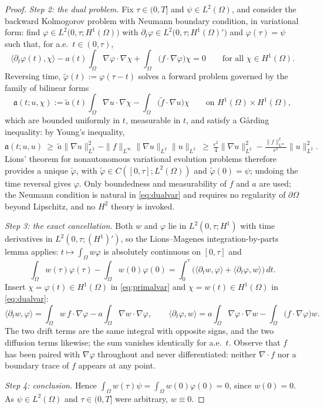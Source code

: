 \documentclass[11pt]{amsart}
\theoremstyle{definition}
\newcommand{\dive}{\nabla\!\cdot}
\newcommand{\dd}{\,d}
\begin{document}
\begin{proof}
\emph{Step 2: the dual problem.} Fix $\tau\in(0,T]$ and
$\psi\in L^2(\Omega)$, and consider the backward Kolmogorov problem
with Neumann boundary condition, in variational form: find
$\varphi\in L^2\big(0,\tau;H^1(\Omega)\big)$ with
$\partial_t\varphi\in L^2\big(0,\tau;H^1(\Omega)'\big)$ and
$\varphi(\tau)=\psi$ such that, for a.e.\ $t\in(0,\tau)$,
\begin{equation}\label{eq:dualvar}
\big\langle\partial_t\varphi(t),\chi\big\rangle
-a(t)\int_\Omega\nabla\varphi\cdot\nabla\chi
+\int_\Omega\big(f\cdot\nabla\varphi\big)\chi=0
\qquad\text{for all }\chi\in H^1(\Omega).
\end{equation}
Reversing time, $\tilde\varphi(t):=\varphi(\tau-t)$ solves a forward
problem governed by the family of bilinear forms
\[
\mathfrak{a}(t;u,\chi):=\tilde a(t)\int_\Omega\nabla u\cdot\nabla\chi
-\int_\Omega\big(\tilde f\cdot\nabla u\big)\chi
\qquad\text{on }H^1(\Omega)\times H^1(\Omega),
\]
which are bounded uniformly in $t$, measurable in $t$, and satisfy a
G\aa rding inequality: by Young's inequality,
\[
\mathfrak{a}(t;u,u)\ \ge\ \tilde a\|\nabla u\|_{L^2}^2
-\|f\|_{L^\infty}\|\nabla u\|_{L^2}\|u\|_{L^2}
\ \ge\ \tfrac{\epsilon^2}{4}\|\nabla u\|_{L^2}^2
-\tfrac{\|f\|_{L^\infty}^2}{\epsilon^2}\|u\|_{L^2}^2 .
\]
Lions' theorem for nonautonomous variational evolution problems
\cite{Lions61} therefore provides a unique 
$\tilde\varphi$, with $\tilde\varphi\in C([0,\tau];L^2(\Omega))$ and
$\tilde\varphi(0)=\psi$; undoing the time reversal gives $\varphi$.
Only boundedness and measurability of $f$ and $a$ are used; the
Neumann condition is natural in \eqref{eq:dualvar} and requires no
regularity of $\partial\Omega$ beyond Lipschitz, and no $H^2$
theory is invoked.

\emph{Step 3: the exact cancellation.} Both $w$ and $\varphi$ lie in
$L^2(0,\tau;H^1)$ with time derivatives in $L^2(0,\tau;(H^1)')$, so
the Lions--Magenes integration-by-parts lemma \cite{Temam} applies:
$t\mapsto\int_\Omega w\varphi$ is absolutely continuous on
$[0,\tau]$ and
\[
\int_\Omega w(\tau)\varphi(\tau)-\int_\Omega w(0)\varphi(0)
=\int_0^\tau\Big(\big\langle\partial_tw,\varphi\big\rangle
+\big\langle\partial_t\varphi,w\big\rangle\Big)\dd t .
\]
Insert $\chi=\varphi(t)\in H^1(\Omega)$ in \eqref{eq:primalvar} and
$\chi=w(t)\in H^1(\Omega)$ in \eqref{eq:dualvar}:
\[
\big\langle\partial_tw,\varphi\big\rangle
=\int_\Omega w\,f\cdot\nabla\varphi
-a\int_\Omega\nabla w\cdot\nabla\varphi,
\qquad
\big\langle\partial_t\varphi,w\big\rangle
=a\int_\Omega\nabla\varphi\cdot\nabla w
-\int_\Omega\big(f\cdot\nabla\varphi\big)w .
\]
The two drift terms are the same integral with opposite signs, and
the two diffusion terms likewise; the sum vanishes identically for
a.e.\ $t$. Observe that $f$ has been paired with $\nabla\varphi$
throughout and never differentiated: neither $\dive f$ nor a
boundary trace of $f$ appears at any point.

\emph{Step 4: conclusion.} Hence $\int_\Omega
w(\tau)\psi=\int_\Omega w(0)\varphi(0)=0$, since $w(0)=0$. As
$\psi\in L^2(\Omega)$ and $\tau\in(0,T]$ were arbitrary, $w\equiv0$.
\end{proof}
\end{document}
